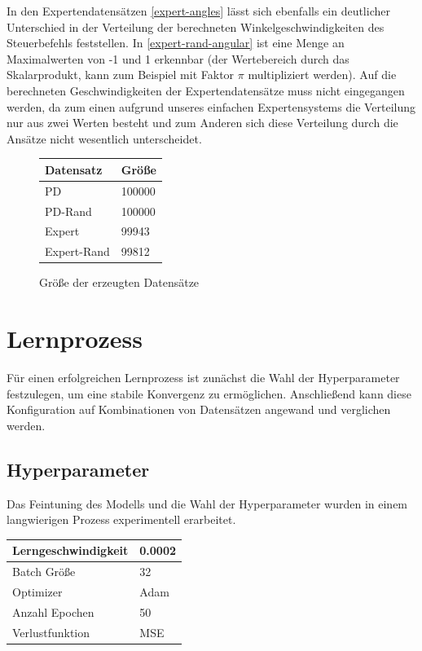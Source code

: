 In den Expertendatensätzen \ref{expert-angles} lässt sich ebenfalls ein deutlicher Unterschied in der Verteilung der berechneten Winkelgeschwindigkeiten des Steuerbefehls feststellen. In \ref{expert-rand-angular} ist eine Menge an Maximalwerten von -1 und 1 erkennbar (der Wertebereich durch das Skalarprodukt, kann zum Beispiel mit Faktor $\pi$ multipliziert werden).
Auf die berechneten Geschwindigkeiten der Expertendatensätze muss nicht eingegangen werden, da zum einen aufgrund unseres einfachen Expertensystems die Verteilung nur aus zwei Werten besteht und zum Anderen sich diese Verteilung durch die Ansätze nicht wesentlich unterscheidet.\\

\begin{figure}[H]
	\centering
	\begin{tabular}[t]{|l|l|}
		\hline
		\textbf{Datensatz} & \textbf{Größe} \\
		\hline
		PD & 100000 \\
		\hline
		PD-Rand & 100000 \\
		\hline
		Expert & 99943 \\
		\hline
		Expert-Rand & 99812 \\
		\hline
	\end{tabular}
	\caption{Größe der erzeugten Datensätze}
\end{figure}

\section{Lernprozess}

Für einen erfolgreichen Lernprozess ist zunächst die Wahl der Hyperparameter festzulegen, um eine stabile Konvergenz zu ermöglichen. Anschließend kann diese Konfiguration auf Kombinationen von Datensätzen angewand und verglichen werden.

\subsection{Hyperparameter}

Das Feintuning des Modells und die Wahl der Hyperparameter wurden in einem langwierigen Prozess experimentell erarbeitet.
\begin{center}
	\begin{tabular}[t]{|l|l|}
		\hline
		Lerngeschwindigkeit & 0.0002 \\
		\hline
		Batch Größe & 32 \\
		\hline
		Optimizer & Adam \\
		\hline
		Anzahl Epochen & 50 \\
		\hline
		Verlustfunktion & MSE \\
		\hline
	\end{tabular}
\end{center}


